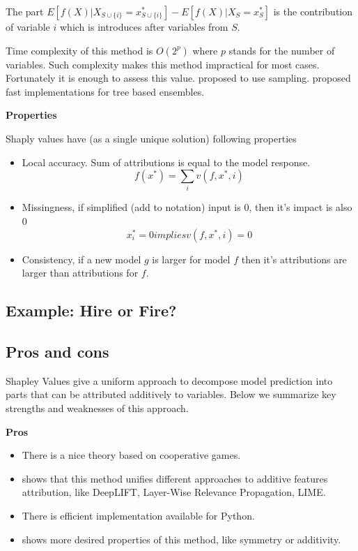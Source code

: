 \documentclass[]{krantz}
\providecommand{\tightlist}{%
  \setlength{\itemsep}{0pt}\setlength{\parskip}{0pt}}
\theoremstyle{definition}
\theoremstyle{definition}
\theoremstyle{definition}
\theoremstyle{remark}
\begin{document}
The part
\(E[f(X) | X_{S \cup \{i\}} = x^*_{S \cup \{i\}}] - E [f(X) | X_{S} = x^*_{S}]\)
is the contribution of variable \(i\) which is introduces after
variables from \(S\).

Time complexity of this method is \(O(2^p)\) where \(p\) stands for the
number of variables. Such complexity makes this method impractical for
most cases. Fortunately it is enough to assess this value.
\citep{Strumbelj2014} proposed to use sampling. \citep{TreeSHAP}
proposed fast implementations for tree based ensembles.

\textbf{Properties}

Shaply values have (as a single unique solution) following properties

\begin{itemize}
\tightlist
\item
  Local accuracy. Sum of attributions is equal to the model response. \[
  f(x^*) = \sum_{i}   v(f, x^*, i) 
  \]
\item
  Missingness, if simplified (add to notation) input is 0, then it's
  impact is also 0 \[
  x_i^* = 0 implies   v(f, x^*, i) = 0
  \]
\item
  Consistency, if a new model \(g\) is larger for model \(f\) then it's
  attributions are larger than attributions for \(f\).
\end{itemize}

\hypertarget{example-hire-or-fire-2}{%
\subsection{Example: Hire or Fire?}\label{example-hire-or-fire-2}}

\hypertarget{pros-and-cons-3}{%
\subsection{Pros and cons}\label{pros-and-cons-3}}

Shapley Values give a uniform approach to decompose model prediction
into parts that can be attributed additively to variables. Below we
summarize key strengths and weaknesses of this approach.

\textbf{Pros}

\begin{itemize}
\tightlist
\item
  There is a nice theory based on cooperative games.
\item
  \citep{SHAP} shows that this method unifies different approaches to
  additive features attribution, like DeepLIFT, Layer-Wise Relevance
  Propagation, LIME.
\item
  There is efficient implementation available for Python.
\item
  \citep{SHAP} shows more desired properties of this method, like
  symmetry or additivity.
\end{itemize}
\end{document}
